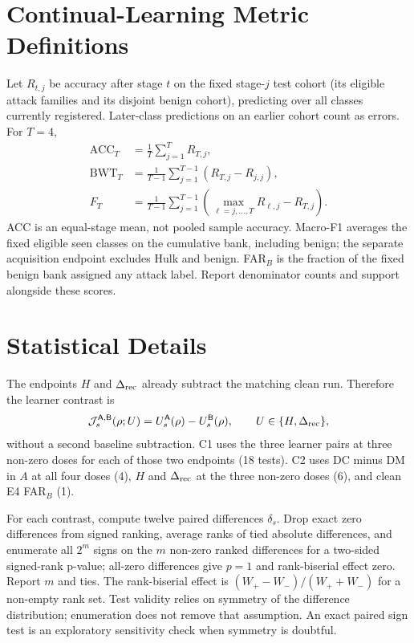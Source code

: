 \documentclass[10pt,a4paper]{article}
\begin{document}
\section{Continual-Learning Metric Definitions}
\label{app:metrics}
Let $R_{t,j}$ be accuracy after stage $t$ on the fixed stage-$j$ test cohort (its eligible attack families and its disjoint benign cohort), predicting over all classes currently registered. Later-class predictions on an earlier cohort count as errors. For $T=4$,
\begin{equation}
\begin{aligned}
\mathrm{ACC}_T&=\tfrac1T\sum_{j=1}^{T}R_{T,j},\\
\mathrm{BWT}_T&=\tfrac1{T-1}\sum_{j=1}^{T-1}(R_{T,j}-R_{j,j}),\\
F_T&=\tfrac1{T-1}\sum_{j=1}^{T-1}\left(\max_{\ell=j,\ldots,T}R_{\ell,j}-R_{T,j}\right).
\end{aligned}
\end{equation}
ACC is an equal-stage mean, not pooled sample accuracy. Macro-F1 averages the fixed eligible seen classes on the cumulative bank, including benign; the separate acquisition endpoint excludes Hulk and benign. FAR$_B$ is the fraction of the fixed benign bank assigned any attack label. Report denominator counts and support alongside these scores.

\section{Statistical Details}
\label{app:stats}
The endpoints $H$ and $\Delta_{\rm rec}$ already subtract the matching clean run. Therefore the learner contrast is
\begin{equation}
\mathcal J_s^{\mathsf A,\mathsf B}(\rho;U)
=U_s^{\mathsf A}(\rho)-U_s^{\mathsf B}(\rho),\qquad U\in\{H,\Delta_{\rm rec}\},
\label{eq:interaction}
\end{equation}
without a second baseline subtraction. C1 uses the three learner pairs at three non-zero doses for each of those two endpoints (18 tests). C2 uses DC minus DM in $A$ at all four doses (4), $H$ and $\Delta_{\rm rec}$ at the three non-zero doses (6), and clean E4 FAR$_B$ (1).

For each contrast, compute twelve paired differences $\delta_s$. Drop exact zero differences from signed ranking, average ranks of tied absolute differences, and enumerate all $2^m$ signs on the $m$ non-zero ranked differences for a two-sided signed-rank p-value; all-zero differences give $p=1$ and rank-biserial effect zero. Report $m$ and ties. The rank-biserial effect is $(W_+-W_-)/(W_++W_-)$ for a non-empty rank set. Test validity relies on symmetry of the difference distribution; enumeration does not remove that assumption. An exact paired sign test is an exploratory sensitivity check when symmetry is doubtful.
\end{document}
